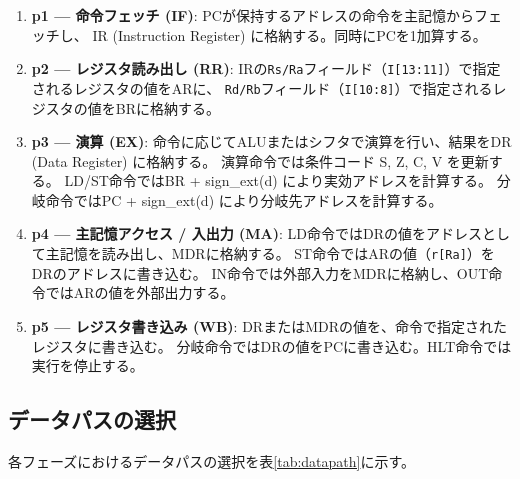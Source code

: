 \documentclass[a4paper,11pt]{ltjsarticle}
\begin{document}
\begin{enumerate}
\item \textbf{p1 — 命令フェッチ (IF)}:
  PCが保持するアドレスの命令を主記憶からフェッチし、
  IR (Instruction Register) に格納する。同時にPCを1加算する。

\item \textbf{p2 — レジスタ読み出し (RR)}:
  IRの\texttt{Rs/Ra}フィールド（\texttt{I[13:11]}）で指定されるレジスタの値をARに、
  \texttt{Rd/Rb}フィールド（\texttt{I[10:8]}）で指定されるレジスタの値をBRに格納する。

\item \textbf{p3 — 演算 (EX)}:
  命令に応じてALUまたはシフタで演算を行い、結果をDR (Data Register) に格納する。
  演算命令では条件コード S, Z, C, V を更新する。
  LD/ST命令ではBR + sign\_ext(d) により実効アドレスを計算する。
  分岐命令ではPC + sign\_ext(d) により分岐先アドレスを計算する。

\item \textbf{p4 — 主記憶アクセス / 入出力 (MA)}:
  LD命令ではDRの値をアドレスとして主記憶を読み出し、MDRに格納する。
  ST命令ではARの値（\texttt{r[Ra]}）をDRのアドレスに書き込む。
  IN命令では外部入力をMDRに格納し、OUT命令ではARの値を外部出力する。

\item \textbf{p5 — レジスタ書き込み (WB)}:
  DRまたはMDRの値を、命令で指定されたレジスタに書き込む。
  分岐命令ではDRの値をPCに書き込む。HLT命令では実行を停止する。
\end{enumerate}

\subsection{データパスの選択}

各フェーズにおけるデータパスの選択を表\ref{tab:datapath}に示す。
\end{document}
